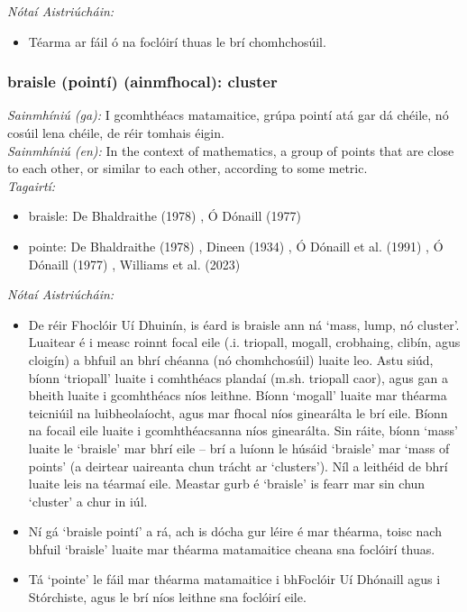  \noindent \textit{Nótaí Aistriúcháin:}
\begin{itemize}
	\item Téarma ar fáil ó na foclóirí thuas le brí chomhchosúil.
\end{itemize}


\subsubsection*{braisle (pointí) (ainmfhocal): cluster}
 \noindent \textit{Sainmhíniú (ga):} I gcomhthéacs matamaitice, grúpa pointí atá gar dá chéile, nó cosúil lena chéile, de réir tomhais éigin.
\\
 \noindent \textit{Sainmhíniú (en):} In the context of mathematics, a group of points that are close to each other, or similar to each other, according to some metric.
\\
 \noindent \textit{Tagairtí:}
\begin{itemize}
	\item braisle: De Bhaldraithe (1978) \cite{de-bhaldraithe}, Ó Dónaill (1977) \cite{odonaill}
	\item pointe: De Bhaldraithe (1978) \cite{de-bhaldraithe}, Dineen (1934) \cite{dineen}, Ó Dónaill et al. (1991) \cite{focloir-beag}, Ó Dónaill (1977) \cite{odonaill}, Williams et al. (2023) \cite{storchiste}
\end{itemize}

 \noindent \textit{Nótaí Aistriúcháin:}
\begin{itemize}
	\item De réir Fhoclóir Uí Dhuinín, is éard is braisle ann ná `mass, lump, nó cluster'. Luaitear é i measc roinnt focal eile (.i. triopall, mogall, crobhaing, clibín, agus cloigín) a bhfuil an bhrí chéanna (nó chomhchosúil) luaite leo. Astu siúd, bíonn `triopall' luaite i comhthéacs plandaí (m.sh. triopall caor), agus gan a bheith luaite i gcomhthéacs níos leithne. Bíonn `mogall' luaite mar théarma teicniúil na luibheolaíocht, agus mar fhocal níos ginearálta le brí eile. Bíonn na focail eile luaite i gcomhthéacsanna níos ginearálta. Sin ráite, bíonn `mass' luaite le `braisle' mar bhrí eile -- brí a luíonn le húsáid `braisle' mar `mass of points' (a deirtear uaireanta chun trácht ar `clusters'). Níl a leithéid de bhrí luaite leis na téarmaí eile. Meastar gurb é `braisle' is fearr mar sin chun `cluster' a chur in iúl.
	\item Ní gá `braisle pointí' a rá, ach is dócha gur léire é mar théarma, toisc nach bhfuil `braisle' luaite mar théarma matamaitice cheana sna foclóirí thuas.
	\item Tá `pointe' le fáil mar théarma matamaitice i bhFoclóir Uí Dhónaill agus i Stórchiste, agus le brí níos leithne sna foclóirí eile.
\end{itemize}


